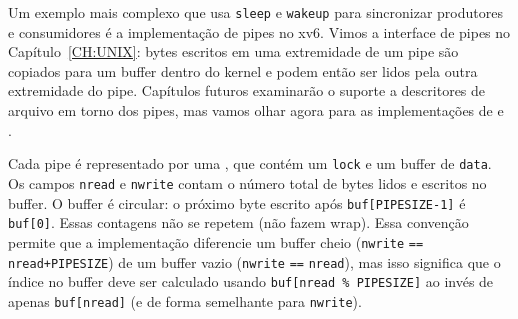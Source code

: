 {%

Um exemplo mais complexo que usa \lstinline{sleep}
e \lstinline{wakeup} para sincronizar produtores e
consumidores é a implementação de pipes no xv6.
Vimos a interface de pipes no Capítulo~\ref{CH:UNIX}:
bytes escritos em uma extremidade de um pipe são copiados
para um buffer dentro do kernel e podem então ser lidos
pela outra extremidade do pipe.
Capítulos futuros examinarão o suporte a descritores de arquivo
em torno dos pipes, mas vamos olhar agora para as
implementações de
e
.

Cada pipe
é representado por uma
,
que contém
um \lstinline{lock}
e um buffer de
\lstinline{data}.
Os campos
\lstinline{nread}
e
\lstinline{nwrite}
contam o número total de bytes lidos e escritos no buffer.
O buffer é circular:
o próximo byte escrito após
\lstinline{buf[PIPESIZE-1]}
é
\lstinline{buf[0]}.
Essas contagens não se repetem (não fazem wrap).
Essa convenção permite que a implementação
diferencie um buffer cheio
(\lstinline{nwrite}
\lstinline{==}
\lstinline{nread+PIPESIZE})
de um buffer vazio
(\lstinline{nwrite}
\lstinline{==}
\lstinline{nread}),
mas isso significa que o índice no buffer
deve ser calculado usando
\lstinline{buf[nread % PIPESIZE]}
ao invés de apenas
\lstinline{buf[nread]}
(e de forma semelhante para
\lstinline{nwrite}).

}
